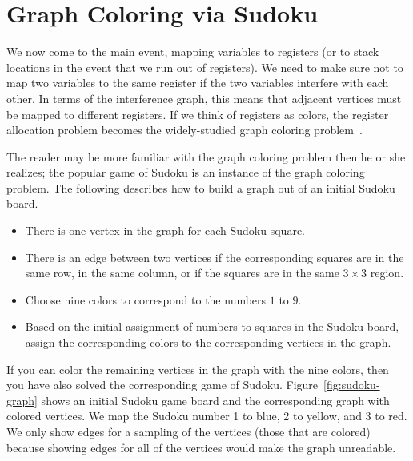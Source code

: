 \documentclass[11pt]{book}
\begin{document}
\section{Graph Coloring via Sudoku}
\label{sec:graph-coloring}

We now come to the main event, mapping variables to registers (or to
stack locations in the event that we run out of registers).  We need
to make sure not to map two variables to the same register if the two
variables interfere with each other.  In terms of the interference
graph, this means that adjacent vertices must be mapped to different
registers.  If we think of registers as colors, the register
allocation problem becomes the widely-studied graph coloring
problem~\citep{Balakrishnan:1996ve,Rosen:2002bh}.

The reader may be more familiar with the graph coloring problem then he
or she realizes; the popular game of Sudoku is an instance of the
graph coloring problem. The following describes how to build a graph
out of an initial Sudoku board.
\begin{itemize}
\item There is one vertex in the graph for each Sudoku square.
\item There is an edge between two vertices if the corresponding squares
  are in the same row, in the same column, or if the squares are in
  the same $3\times 3$ region.
\item Choose nine colors to correspond to the numbers $1$ to $9$.
\item Based on the initial assignment of numbers to squares in the
  Sudoku board, assign the corresponding colors to the corresponding
  vertices in the graph.
\end{itemize}
If you can color the remaining vertices in the graph with the nine
colors, then you have also solved the corresponding game of Sudoku.
Figure~\ref{fig:sudoku-graph} shows an initial Sudoku game board and
the corresponding graph with colored vertices.  We map the Sudoku
number 1 to blue, 2 to yellow, and 3 to red.  We only show edges for a
sampling of the vertices (those that are colored) because showing
edges for all of the vertices would make the graph unreadable.
\end{document}
